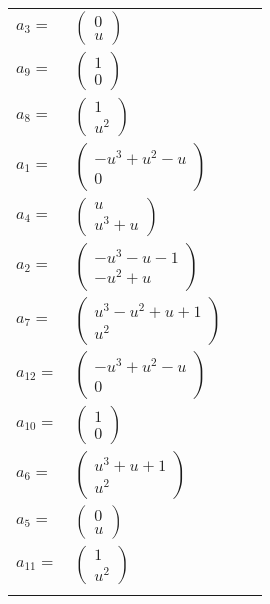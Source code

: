 \documentclass[1p]{elsarticle_modified}
\theoremstyle{definition}
\begin{document}
\begin{tabular}{m{7pt} m{180pt} m{7pt} m{180pt} }
\flushright $a_{3}=$&$\begin{pmatrix}0\\u\end{pmatrix}$ \\
\flushright $a_{9}=$&$\begin{pmatrix}1\\0\end{pmatrix}$ \\
\flushright $a_{8}=$&$\begin{pmatrix}1\\u^2\end{pmatrix}$ \\
\flushright $a_{1}=$&$\begin{pmatrix}- u^3+u^2- u\\0\end{pmatrix}$ \\
\flushright $a_{4}=$&$\begin{pmatrix}u\\u^3+u\end{pmatrix}$ \\
\flushright $a_{2}=$&$\begin{pmatrix}- u^3- u-1\\- u^2+u\end{pmatrix}$ \\
\flushright $a_{7}=$&$\begin{pmatrix}u^3- u^2+u+1\\u^2\end{pmatrix}$ \\
\flushright $a_{12}=$&$\begin{pmatrix}- u^3+u^2- u\\0\end{pmatrix}$ \\
\flushright $a_{10}=$&$\begin{pmatrix}1\\0\end{pmatrix}$ \\
\flushright $a_{6}=$&$\begin{pmatrix}u^3+u+1\\u^2\end{pmatrix}$ \\
\flushright $a_{5}=$&$\begin{pmatrix}0\\u\end{pmatrix}$ \\
\flushright $a_{11}=$&$\begin{pmatrix}1\\u^2\end{pmatrix}$\\&\end{tabular}
\end{document}
